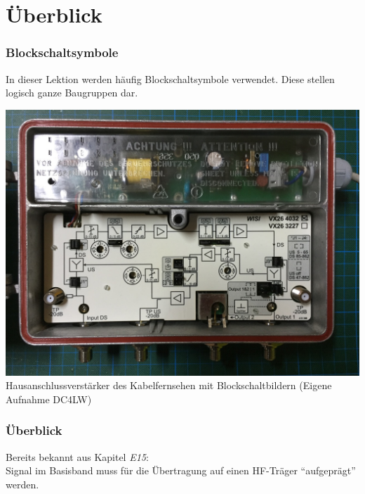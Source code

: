 

\subtitle{Technik Klasse A 13: \\
          Frequenzaufbereitung \\[2em]}
\date{Stand 17.06.2016}



\section{Überblick}

\begin{frame}
  \frametitle{Blockschaltsymbole}
  In dieser Lektion werden häufig Blockschaltsymbole verwendet. Diese stellen logisch ganze Baugruppen dar.

  \begin{center}
    \includegraphics[width=\textwidth,height=.65\textheight,keepaspectratio]{a13/IMG_4686.jpg}\\
    {\small Hausanschlussverstärker des Kabelfernsehen mit Blockschaltbildern} {\tiny (Eigene Aufnahme DC4LW)}
  \end{center}
\end{frame}

\begin{frame}
    \frametitle{Überblick}

    Bereits bekannt aus Kapitel \emph{E15}: \\[2em]

    Signal im Basisband muss für die Übertragung auf einen HF-Träger
    ``aufgeprägt'' werden.
\end{frame}

